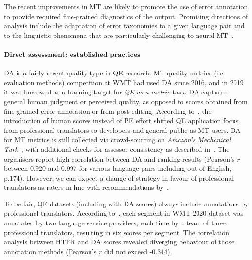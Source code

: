 The recent improvements in MT are likely to promote the use of error annotation to provide required fine-grained diagnostics of the output. Promising directions of analysis include the adaptation of error taxonomies to a given language pair and to the linguistic phenomena that are particularly challenging to neural MT~\cite{Klubivcka2018}. 

\paragraph{\label{par:da_best}Direct assessment: established practices}
\gls{DA} is a fairly recent quality type in QE research. MT quality metrics (i.e. evaluation methods) competition at WMT had used DA since 2016, and in 2019 it was borrowed as a learning target for \textit{QE as a metric} task. 
DA captures general human judgment or perceived quality, as opposed to scores obtained from fine-grained error annotation or from post-editing. 
According to~\citet{Fonseca2019}, the introduction of human scores instead of PE effort shifted QE application focus from professional translators to developers and general public as MT users. 
DA for MT metrics is still collected via crowd-sourcing on \textit{Amazon's Mechanical Turk}~\cite[p.9]{Akhbardeh2021}, with additional checks for assessor consistency as described in~\citet{Graham2015}. The organisers report high correlation between DA and ranking results (Pearson's $r$ between 0.920 and 0.997 for various language pairs including out-of-English, p.174).
However, we can expect a change of strategy in favour of professional translators as raters in line with recommendations by~\citet{Laubli2020}.

To be fair, QE datasets (including with DA scores) always include annotations by professional translators. According to~\citet{Fomicheva2020a}, each segment in WMT-2020 dataset was annotated by two language service providers, each time by a team of three professional translators, resulting in six scores per segment. The correlation analysis between HTER and DA scores revealed diverging behaviour of those annotation methods (Pearson's $r$ did not exceed -0.344).

